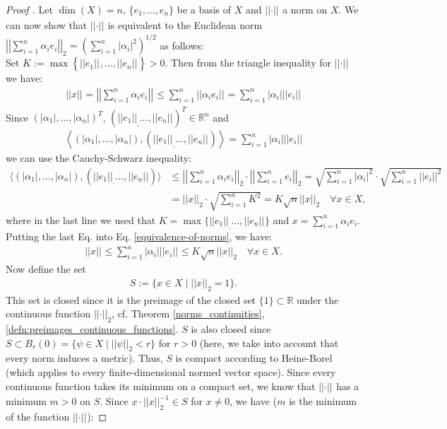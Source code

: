 \documentclass[12pt, a4paper]{article}
\numberwithin{equation}{section}
\theoremstyle{definition}
\theoremstyle{definition}
\newcommand{\norm}[2]{\left\vert\left\vert #1 \right\vert\right\vert_{#2}}
\newcommand{\abs}[1]{\left\vert #1 \right\vert}
\begin{document}
	\begin{proof}[Proof \cite{werner-fa}] Let $\dim(X) = n$, $\{e_1, \dots, e_n\}$ be a basis of $X$ and $\norm{\cdot}{}$ a norm on $X$. We can now show that $\norm{\cdot}{}$ is equivalent to the Euclidean norm $\norm{\sum_{i = 1}^n\alpha_ie_i}{2} = \left( \sum_{i = 1}^{n}\left\vert \alpha_i \right\vert^2 \right)^{1/2}$ as follows: \\[6pt] Set $K:= \max\left\{ \norm{e_1}{}, \dots, \norm{e_n}{}\right\} > 0$. Then from the triangle inequality for $\norm{\cdot}{}$ we have: 
	\begin{align}\label{equivalence-of-norms}
		\norm{x}{} = \norm{\sum_{i= 1}^{n}\alpha_ie_i}{} \leq \sum_{i= 1}^n \norm{\alpha_ie_i}{} = \sum_{i= 1}^n \abs{\alpha_i} \norm{e_i}{}
	\end{align}
	Since $(\abs{\alpha_1}, \dots, \abs{\alpha_n})^T$, $(\norm{e_1}, \dots, \norm{e_n}{})^T\in \mathbb R^n$ and 
	\begin{align}
		\left\langle \left(\abs{\alpha_1}, \dots, \abs{\alpha_n}\right), (\norm{e_1}, \dots, \norm{e_n}{} ) \right\rangle = \sum_{i = 1}^n \abs{\alpha_i}\norm{e_i}{}
	\end{align}
	we can use the Cauchy-Schwarz inequality: 
	\begin{align}
		\langle (\abs{\alpha_1}, \dots, \abs{\alpha_n}), (\norm{e_1}, \dots, \norm{e_n}{} ) \rangle &\leq \norm{\sum_{i=1}^n \alpha_ie_i}{2}\cdot \norm{\sum_{i= 1}^n e_i}{2} = \sqrt{\sum_{i = 1}^n\abs{\alpha_i}^2} \cdot \sqrt{\sum_{i = 1}^n\norm{e_i}{}^2}
		\\[8pt] &= \norm{x}{2}\cdot \sqrt{\sum_{i=1}^n K^2} = K\sqrt{n}\norm{x}{2} \quad \forall x\in X, 
	\end{align}
	where in the last line we used that $K = \max\{\norm{e_1}, \dots, \norm{e_n}{}\}$ and $x = \sum_{i = 1}^n \alpha_i e_i$. Putting the last Eq. into Eq. \eqref{equivalence-of-norms}, we have: 
	\begin{align}\label{fa_equiv_norms_intermed_1}
		\norm{x}{} \leq \sum_{i=1}^{n} \abs{\alpha_i}\norm{e_i}{} \leq K\sqrt{n}\norm{x}{2} \quad \forall x\in X.
	\end{align}
	Now define the set 
	\begin{align}
		S:= \{ x\in X \mid \norm{x}{2} = 1 \}. 
	\end{align}
	This set is closed since it is the preimage of the closed set $\{1\}\subset \mathbb R$ under the continuous function $\norm{\cdot}{2}$, cf. Theorem \ref{norms_continuities}, \ref{defn:preimages_continuous_functions}. $S$ is also closed since $S\subset B_{r}(0) = \{\psi\in X\mid \norm{\psi}{2} < r\}$ for $r>0$ (here, we take into account that every norm induces a metric). Thus, $S$ is compact according to Heine-Borel (which applies to every finite-dimensional normed vector space). Since every continuous function takes its minimum on a compact set, we know that $\norm{\cdot}{}$ has a minimum $m > 0$ on $S$. Since $x\cdot \norm{x}{2}^{-1}\in S$ for $x\ne 0$, we have ($m$ is the minimum of the function $\norm{\cdot}{}$): 

\end{proof}
\end{document}
